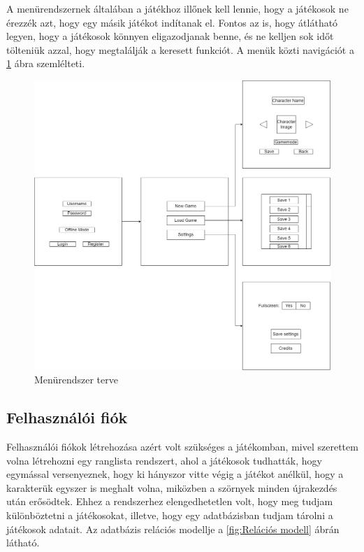  A menürendszernek általában a játékhoz illőnek kell lennie, hogy a játékosok ne érezzék azt, hogy egy másik játékot indítanak el. Fontos az is, hogy átlátható legyen, hogy a játékosok könnyen eligazodjanak benne, és ne kelljen sok időt tölteniük azzal, hogy megtalálják a keresett funkciót. A menük közti navigációt a \ref{fig:Menürendszer terve} ábra szemlélteti.

\begin{figure}[H]
    \centering
    \includegraphics[width=14.0truecm]{images/MS_menu.drawio.png}
    \caption{Menürendszer terve}
    \label{fig:Menürendszer terve}
\end{figure}

\subsection{Felhasználói fiók}
 Felhasználói fiókok létrehozása azért volt szükséges a játékomban, mivel szerettem volna létrehozni egy ranglista rendszert, ahol a játékosok tudhatták, hogy egymással versenyeznek, hogy ki hányszor vitte végig a játékot anélkül, hogy a karakterük egyszer is meghalt volna, miközben a szörnyek minden újrakezdés után erősödtek. Ehhez a rendszerhez elengedhetetlen volt, hogy meg tudjam különböztetni a játékosokat, illetve, hogy egy adatbázisban tudjam tárolni a játékosok adatait. Az adatbázis relációs modellje a \ref{fig:Relációs modell} ábrán látható.

